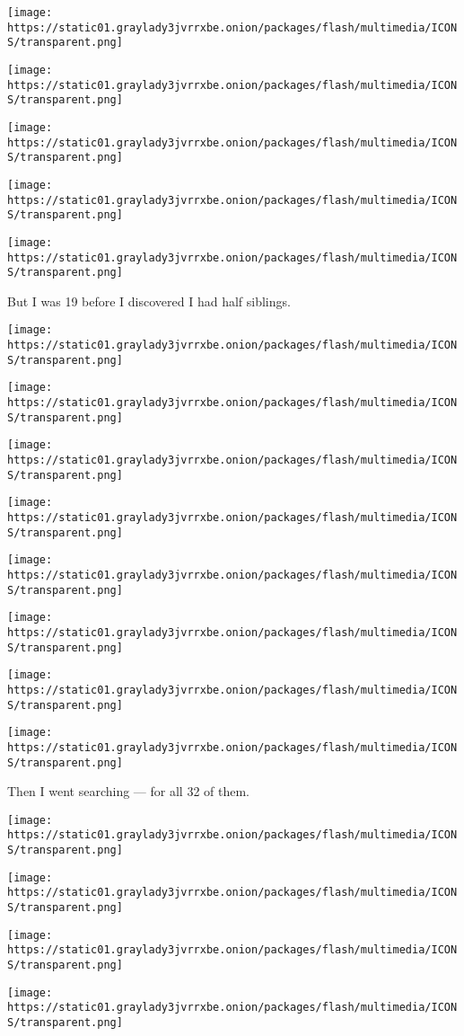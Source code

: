 \texttt{[image: https://static01.graylady3jvrrxbe.onion/packages/flash/multimedia/ICONS/transparent.png]}

\texttt{[image: https://static01.graylady3jvrrxbe.onion/packages/flash/multimedia/ICONS/transparent.png]}

\texttt{[image: https://static01.graylady3jvrrxbe.onion/packages/flash/multimedia/ICONS/transparent.png]}

\texttt{[image: https://static01.graylady3jvrrxbe.onion/packages/flash/multimedia/ICONS/transparent.png]}

\texttt{[image: https://static01.graylady3jvrrxbe.onion/packages/flash/multimedia/ICONS/transparent.png]}

But I was 19 before I discovered I had half siblings.

\texttt{[image: https://static01.graylady3jvrrxbe.onion/packages/flash/multimedia/ICONS/transparent.png]}

\texttt{[image: https://static01.graylady3jvrrxbe.onion/packages/flash/multimedia/ICONS/transparent.png]}

\texttt{[image: https://static01.graylady3jvrrxbe.onion/packages/flash/multimedia/ICONS/transparent.png]}

\texttt{[image: https://static01.graylady3jvrrxbe.onion/packages/flash/multimedia/ICONS/transparent.png]}

\texttt{[image: https://static01.graylady3jvrrxbe.onion/packages/flash/multimedia/ICONS/transparent.png]}

\texttt{[image: https://static01.graylady3jvrrxbe.onion/packages/flash/multimedia/ICONS/transparent.png]}

\texttt{[image: https://static01.graylady3jvrrxbe.onion/packages/flash/multimedia/ICONS/transparent.png]}

\texttt{[image: https://static01.graylady3jvrrxbe.onion/packages/flash/multimedia/ICONS/transparent.png]}

Then I went searching --- for all 32 of them.

\texttt{[image: https://static01.graylady3jvrrxbe.onion/packages/flash/multimedia/ICONS/transparent.png]}

\texttt{[image: https://static01.graylady3jvrrxbe.onion/packages/flash/multimedia/ICONS/transparent.png]}

\texttt{[image: https://static01.graylady3jvrrxbe.onion/packages/flash/multimedia/ICONS/transparent.png]}

\texttt{[image: https://static01.graylady3jvrrxbe.onion/packages/flash/multimedia/ICONS/transparent.png]}

